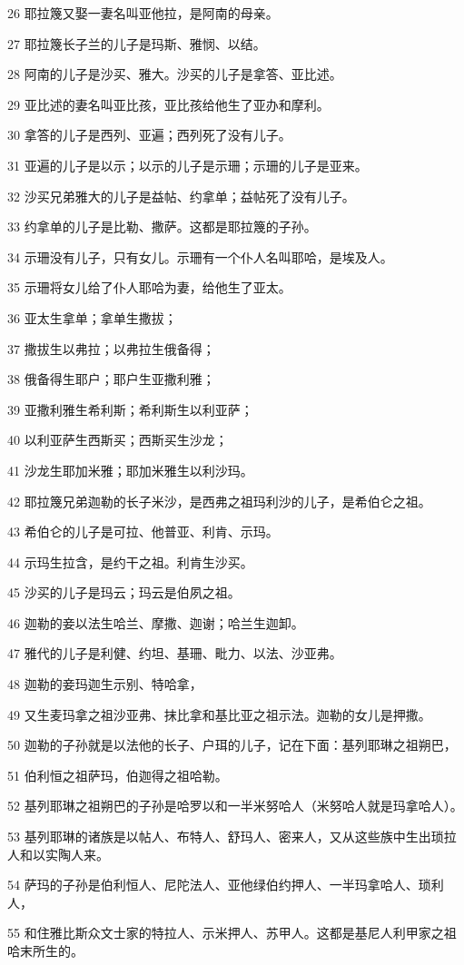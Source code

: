 \par 26 耶拉篾又娶一妻名叫亚他拉，是阿南的母亲。
\par 27 耶拉篾长子兰的儿子是玛斯、雅悯、以结。
\par 28 阿南的儿子是沙买、雅大。沙买的儿子是拿答、亚比述。
\par 29 亚比述的妻名叫亚比孩，亚比孩给他生了亚办和摩利。
\par 30 拿答的儿子是西列、亚遍；西列死了没有儿子。
\par 31 亚遍的儿子是以示；以示的儿子是示珊；示珊的儿子是亚来。
\par 32 沙买兄弟雅大的儿子是益帖、约拿单；益帖死了没有儿子。
\par 33 约拿单的儿子是比勒、撒萨。这都是耶拉篾的子孙。
\par 34 示珊没有儿子，只有女儿。示珊有一个仆人名叫耶哈，是埃及人。
\par 35 示珊将女儿给了仆人耶哈为妻，给他生了亚太。
\par 36 亚太生拿单；拿单生撒拔；
\par 37 撒拔生以弗拉；以弗拉生俄备得；
\par 38 俄备得生耶户；耶户生亚撒利雅；
\par 39 亚撒利雅生希利斯；希利斯生以利亚萨；
\par 40 以利亚萨生西斯买；西斯买生沙龙；
\par 41 沙龙生耶加米雅；耶加米雅生以利沙玛。
\par 42 耶拉篾兄弟迦勒的长子米沙，是西弗之祖玛利沙的儿子，是希伯仑之祖。
\par 43 希伯仑的儿子是可拉、他普亚、利肯、示玛。
\par 44 示玛生拉含，是约干之祖。利肯生沙买。
\par 45 沙买的儿子是玛云；玛云是伯夙之祖。
\par 46 迦勒的妾以法生哈兰、摩撒、迦谢；哈兰生迦卸。
\par 47 雅代的儿子是利健、约坦、基珊、毗力、以法、沙亚弗。
\par 48 迦勒的妾玛迦生示别、特哈拿，
\par 49 又生麦玛拿之祖沙亚弗、抹比拿和基比亚之祖示法。迦勒的女儿是押撒。
\par 50 迦勒的子孙就是以法他的长子、户珥的儿子，记在下面：基列耶琳之祖朔巴，
\par 51 伯利恒之祖萨玛，伯迦得之祖哈勒。
\par 52 基列耶琳之祖朔巴的子孙是哈罗以和一半米努哈人（米努哈人就是玛拿哈人）。
\par 53 基列耶琳的诸族是以帖人、布特人、舒玛人、密来人，又从这些族中生出琐拉人和以实陶人来。
\par 54 萨玛的子孙是伯利恒人、尼陀法人、亚他绿伯约押人、一半玛拿哈人、琐利人，
\par 55 和住雅比斯众文士家的特拉人、示米押人、苏甲人。这都是基尼人利甲家之祖哈末所生的。

